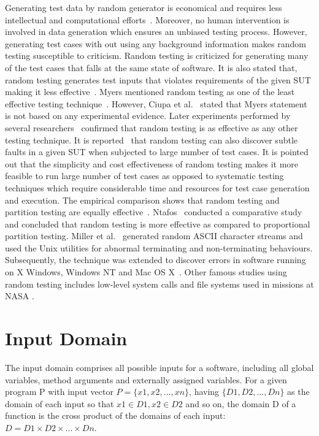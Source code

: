 Generating test data by random generator is economical and requires less intellectual and computational efforts~\cite{ciupa2008artoo}. Moreover, no human intervention is involved in data generation which ensures an unbiased testing process. However, generating test cases with out using any background information makes random testing susceptible to criticism. Random testing is criticized for generating many of the test cases that falls at the same state of software. It is also stated that, random testing generates test inputs that violates requirements of the given SUT making it less effective~\cite{pacheco2009directed, sen2007effective}. Myers mentioned random testing as one of the least effective testing technique~\cite{myers2011art}. However, Ciupa et al.~\cite{ciupa2007experimental} stated that Myers statement is not based on any experimental evidence. Later experiments performed by several researchers~\cite{ciupa2008finding, hamlet1994random,  leitner2007efficient} confirmed that random testing is as effective as any other testing technique. It is reported~\cite{duran1981report} that random testing can also discover subtle faults in a given SUT when subjected to large number of test cases. It is pointed out that the simplicity and cost effectiveness of random testing makes it more feasible to run large number of test cases as opposed to systematic testing techniques which require considerable time and resources for test case generation and execution. The empirical comparison shows that random testing and partition testing are equally effective~\cite{hamlet1990partition}. Ntafos~\cite{ntafos1998random} conducted a comparative study and concluded that random testing is more effective as compared to proportional partition testing. Miller et al.~\cite{miller1990empirical} generated random ASCII character streams and used the Unix utilities for abnormal terminating and non-terminating behaviours. Subsequently, the technique was extended to discover errors in software running on X Windows, Windows NT and Mac OS X~\cite{forrester2000empirical, miller2006empirical}. Other famous studies using random testing includes low-level system calls \cite{kropp1998automated} and file systems used in missions at NASA \cite{groce2007randomized}.






\section{Input Domain} 
The input domain comprises all possible inputs for a software, including all global variables, method arguments and externally assigned variables. For a given program P with input vector $ P =\{x1, x2, . . . , xn\}$, having $\{D1, D2, . . . , Dn\}$ as the domain of each input so that $x1 \in D1, x2 \in D2$ and so on, the domain D of a function is the cross product of the domains of each input: $D = D1 \times D2 \times . . . \times Dn$.

